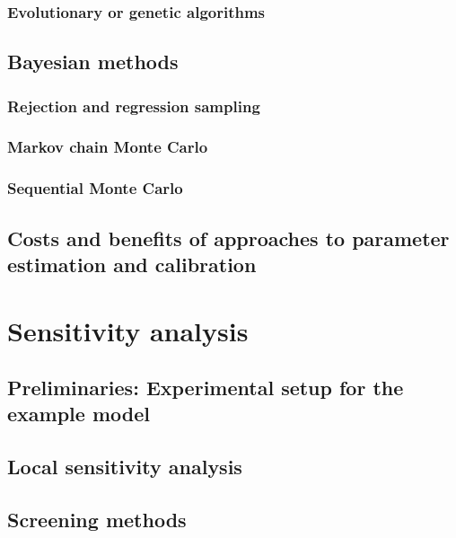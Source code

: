 \subsubsection{Evolutionary or genetic algorithms}
\label{thiele:parameter:optimisation:genetic}

\subsection{Bayesian methods}
\label{thiele:parameter:bayesian}

\subsubsection{Rejection and regression sampling}
\label{thiele:parameter:bayesian:rejection}

\subsubsection{Markov chain Monte Carlo}
\label{thiele:parameter:bayesian:mcmc}

\subsubsection{Sequential Monte Carlo}
\label{thiele:parameter:bayesian:seqmc}

\subsection{Costs and benefits of approaches to parameter estimation and calibration}
\label{thiele:parameter:cost_and_benefits}

\section{Sensitivity analysis}
\label{thiele:sensitivity_analysis}

\subsection{Preliminaries: Experimental setup for the example model}
\label{thiele:sensitivity:prelims}

\subsection{Local sensitivity analysis}
\label{thiele:sensitivity:local}

\subsection{Screening methods}
\label{thiele:sensitivity:screening}

